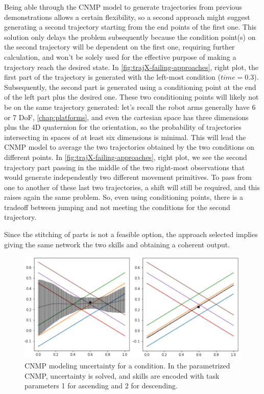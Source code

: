Being able through the CNMP model to generate trajectories from previous demonstrations allows a certain flexibility, so a second approach might suggest generating a second trajectory starting from the end points of the first one. This solution only delays the problem subsequently because the condition point(s) on the second trajectory will be dependent on the first one, requiring further calculation, and won't be solely used for the effective purpose of making a trajectory reach the desired state. In \cref{fig:trajX-failing-approaches}, right plot, the first part of the trajectory is generated with the left-most condition ($time=0.3$). Subsequently, the second part is generated using a conditioning point at the end of the left part plus the desired one. These two conditioning points will likely not be on the same trajectory generated: let's recall the robot arms generally have 6 or 7 DoF, \cref{chap:platforms}, and even the cartesian space has three dimensions plus the 4D quaternion for the orientation, so the probability of trajectories intersecting in spaces of at least six dimensions is minimal. This will lead the CNMP model to average the two trajectories obtained by the two conditions on different points. In \cref{fig:trajX-failing-approaches}, right plot, we see the second trajectory part passing in the middle of the two right-most observations that would generate independently two different movement primitives. To pass from one to another of these last two trajectories, a shift will still be required, and this raises again the same problem. 
So, even using conditioning points, there is a tradeoff between jumping and not meeting the conditions for the second trajectory.

Since the stitching of parts is not a feasible option, the approach selected implies giving the same network the two skills and obtaining a coherent output.

\begin{figure}
    \centering
    \includegraphics[width=0.8\linewidth]{figures/trajX+tp.png}
    \caption{ CNMP modeling uncertainty for a condition. In the parametrized CNMP, uncertainty is solved, and skills are encoded with task parameters 1 for ascending and 2 for descending. }
    \label{fig:trajX+tp}
\end{figure}


